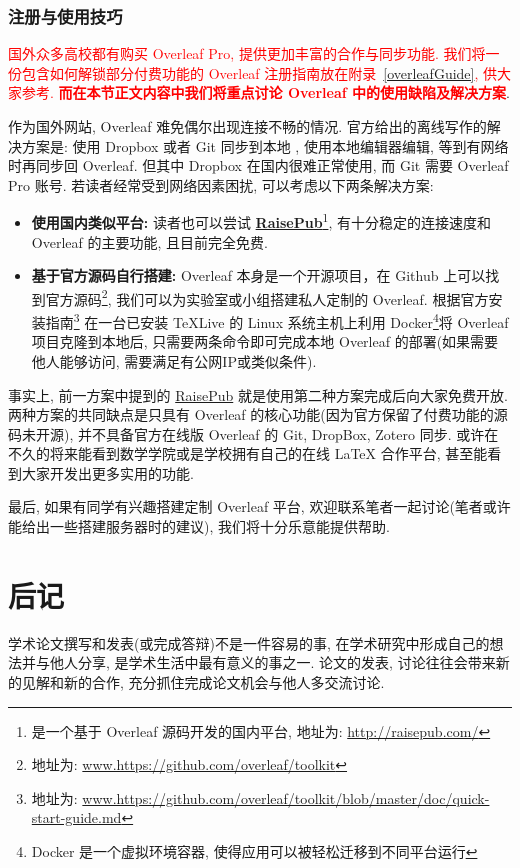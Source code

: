 \documentclass{formatBook}
\newcommand{\XG}[1]{\textcolor{red}{#1}}
\begin{document}
\subsection{注册与使用技巧}
\XG{国外众多高校都有购买 Overleaf Pro, 提供更加丰富的合作与同步功能. 我们将一份包含如何解锁部分付费功能的 Overleaf 注册指南放在附录~\ref{overleafGuide}, 供大家参考. \textbf{而在本节正文内容中我们将重点讨论 Overleaf 中的使用缺陷及解决方案}}.

{作为国外网站, Overleaf 难免偶尔出现连接不畅的情况. 官方给出的离线写作的解决方案是: 使用 Dropbox 或者 Git 同步到本地 , 使用本地编辑器编辑, 等到有网络时再同步回 Overleaf. 但其中 Dropbox 在国内很难正常使用, 而 Git 需要 Overleaf Pro 账号. 若读者经常受到网络因素困扰, 可以考虑以下两条解决方案:}

\begin{itemize}
    \item {\textbf{使用国内类似平台:} 读者也可以尝试 \textbf{\href{http://raisepub.com/}{RaisePub}}\footnote{是一个基于 Overleaf 源码开发的国内平台, 地址为: \url{http://raisepub.com/}}, 有十分稳定的连接速度和 Overleaf 的主要功能, 且目前完全免费.}
    \item {\textbf{基于官方源码自行搭建:} Overleaf 本身是一个开源项目，在 Github 上可以找到官方源码\footnote{地址为: \url{www.https://github.com/overleaf/toolkit}}, 我们可以为实验室或小组搭建私人定制的 Overleaf. 根据官方安装指南\footnote{地址为: \url{www.https://github.com/overleaf/toolkit/blob/master/doc/quick-start-guide.md}} 在一台已安装 TeXLive 的 Linux 系统主机上利用 Docker\footnote{Docker 是一个虚拟环境容器, 使得应用可以被轻松迁移到不同平台运行}将 Overleaf 项目克隆到本地后, 只需要两条命令即可完成本地 Overleaf 的部署(如果需要他人能够访问, 需要满足有公网IP或类似条件).}
\end{itemize}

{事实上, 前一方案中提到的 \href{http://raisepub.com/}{RaisePub} 就是使用第二种方案完成后向大家免费开放. 两种方案的共同缺点是只具有 Overleaf 的核心功能(因为官方保留了付费功能的源码未开源), 并不具备官方在线版 Overleaf 的 Git, DropBox, Zotero 同步. 或许在不久的将来能看到数学学院或是学校拥有自己的在线 LaTeX 合作平台, 甚至能看到大家开发出更多实用的功能. }

{最后, 如果有同学有兴趣搭建定制 Overleaf 平台, 欢迎联系笔者一起讨论(笔者或许能给出一些搭建服务器时的建议), 我们将十分乐意能提供帮助.}

\chapter{后记}
学术论文撰写和发表(或完成答辩)不是一件容易的事, 在学术研究中形成自己的想法并与他人分享, 是学术生活中最有意义的事之一. 论文的发表, 讨论往往会带来新的见解和新的合作, 充分抓住完成论文机会与他人多交流讨论.
\end{document}
